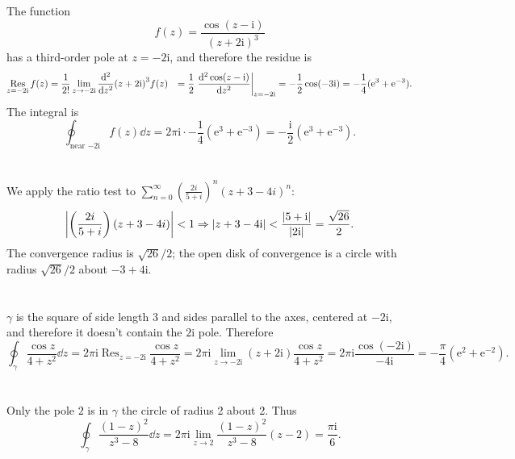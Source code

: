 \documentclass[hyperref, a4paper]{article}
\DeclareMathOperator{\res}{Res}
\newcommand*{\ii}{\mathrm{i}}
\newcommand*{\ee}{\mathrm{e}}
\def\\{}%
\begin{document}
\section{}

The function
\begin{equation}
    f(z) = \frac{\cos (z - \ii)}{(z + 2 \ii)^3}
\end{equation}
has a third-order pole at $z = - 2 \ii$,
and therefore the residue is 
\begin{equation}
   \begin{aligned}
    \res_{z = - 2 \ii} f(z) &= \frac{1}{2!} \lim_{z \to - 2 \ii} \dv[2]{z}
    (z + 2 \ii)^3 f(z) \\
    &= \frac{1}{2} \eval{\dv[2]{\cos(z - \ii)}{z}}_{z = - 2 \ii} 
    = - \frac{1}{2} \cos (- 3 \ii) = - \frac{1}{4} (\ee^{3} + \ee^{-3}).
   \end{aligned}
\end{equation}
The integral is 
\begin{equation}
    \oint_{\text{near $- 2 \ii$}} f(z) \dd{z} = 2 \pi \ii \cdot - \frac{1}{4} (\ee^{3} + \ee^{-3})
    = - \frac{\ii}{2}  (\ee^{3} + \ee^{-3}).
\end{equation}

\section{}

We apply the ratio test to $\sum_{n=0}^{\infty}\left(\frac{2 i}{5+i}\right)^n(z+3-4 i)^n$:
\begin{equation}
    \abs{\left(\frac{2 i}{5+i}\right)(z+3-4 i)} < 1 \Rightarrow
    \abs{z + 3 - 4 \ii} < \frac{\abs{5 + \ii}}{\abs{2 \ii}} = \frac{\sqrt{26}}{2}.
\end{equation}
The convergence radius is $\sqrt{26} / 2$; 
the open disk of convergence is a circle with radius $\sqrt{26} / 2$ 
about $- 3 + 4 \ii$.

\section{}

$\gamma$ is the square of side length 3 and sides parallel to the axes, centered at $-2 \mathrm{i}$,
and therefore it doesn't contain the $2 \ii$ pole.
Therefore 
\begin{equation}
    \oint_\gamma \frac{\cos z}{4+z^2} \dd{z}
    = 2 \pi \ii \res_{z = - 2 \ii} \frac{\cos z}{4+z^2} 
    = 2 \pi \ii \lim_{z \to - 2 \ii} (z + 2 \ii) \frac{\cos z}{4+z^2} 
    = 2 \pi \ii \frac{\cos(-2 \ii)}{- 4 \ii}
    = - \frac{\pi}{4} (\ee^{2} + \ee^{-2}).
\end{equation}

\section{}

Only the pole $2$ is in $\gamma$ the circle of radius 2 about 2.
Thus 
\begin{equation}
    \oint_\gamma \frac{(1-z)^2}{z^3-8} \dd z = 
    2 \pi \ii \lim_{z \to 2} \frac{(1-z)^2}{z^3-8} (z - 2)
    = \frac{\pi \ii}{6}.
\end{equation}
\end{document}
